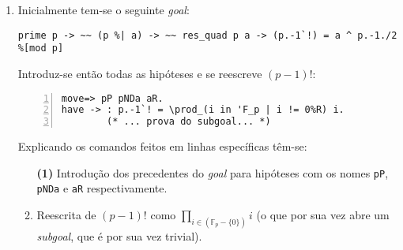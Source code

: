 \begin{enumerate}[label=\textbf{\roman*.}]


        \item Inicialmente tem-se o seguinte \textit{goal}:
                \begin{lstlisting}[language=coq,frame=single,tabsize=1]
prime p -> ~~ (p %| a) -> ~~ res_quad p a -> (p.-1`!) = a ^ p.-1./2 %[mod p]
                \end{lstlisting}
        Introduz-se então todas as hipóteses e se reescreve $(p-1)!$:
                \begin{lstlisting}[language=coq,frame=single, numbers=left,stepnumber=1,tabsize=1,name=proof]
move=> pP pNDa aR.
have -> : p.-1`! = \prod_(i in 'F_p | i != 0%R) i.
        (* ... prova do subgoal... *)
                \end{lstlisting}
        Explicando os comandos feitos em linhas específicas têm-se:
        \begin{enumerate}
                \item[\textbf{(1)}] Introdução dos precedentes do \textit{goal} para hipóteses com os nomes \lstinline[language=coq]|pP|, \lstinline[language=coq]|pNDa| e \lstinline[language=coq]|aR| respectivamente.
                
                \item[\textbf{(2)}] Reescrita de $(p-1)!$ como $\prod_{i \in (\mathbb{F}_p - \{0\})} i$ (o que por sua vez abre um \textit{subgoal}, que é por sua vez trivial).
                
        \end{enumerate}



\end{enumerate}
